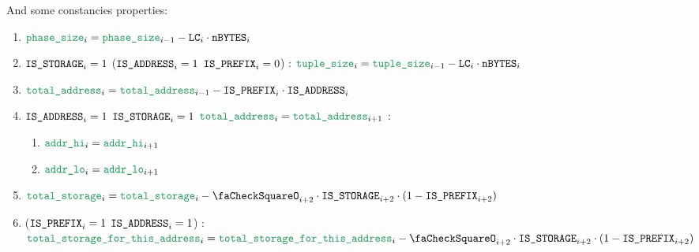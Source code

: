 \begin{enumerate}[resume]
		And some constancies properties:
		\begin{enumerate}
			\item $\locPhaseSize_{i} = \locPhaseSize_{i-1} - \lc_{i} \cdot \limbsize_{i}$
			\item \If $\texttt{IS\_STORAGE}_{i} =1$ \Or ($\texttt{IS\_ADDRESS}_{i} =1$ \et $\texttt{IS\_PREFIX}_{i} =0$) \Then: $\locAccessListTupleSize_{i} = \locAccessListTupleSize_{i-1} - \lc_{i} \cdot \limbsize_{i}$
			\item $\locTotNbOfAddress_{i} = \locTotNbOfAddress_{i-1} - \isPrefix_{i} \cdot \isAddr_{i}$
			\item \If $\texttt{IS\_ADDRESS}_{i} =1$ \et $\texttt{IS\_STORAGE}_{i}=1$ \et $\locTotNbOfAddress_{i} = \locTotNbOfAddress_{i+1}$ \Then:
				\begin{enumerate}
					\item $\locAddressHi_{i} = \locAddressHi_{i+1}$
					\item $\locAddressLo_{i} = \locAddressLo_{i+1}$
				\end{enumerate}
			\item $\locTotNbOfStorage_{i} = \locTotNbOfStorage_{i} - \done_{i+2} \cdot \isSto_{i+2} \cdot (1 - \isPrefix_{i+2})$
			\item \If ($\texttt{IS\_PREFIX}_{i} =1$ \et $\texttt{IS\_ADDRESS}_{i} =1$) \Then: $\locTotStorageForThisAddress_{i} = \locTotStorageForThisAddress_{i} - \done_{i+2} \cdot \isSto_{i+2} \cdot (1 - \isPrefix_{i+2})$
		\end{enumerate}
	\end{enumerate}
